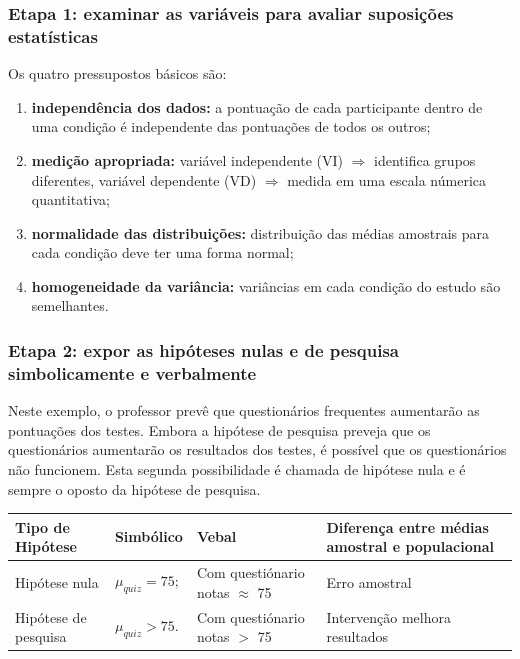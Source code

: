 \documentclass[11pt]{beamer}
\begin{document}
\begin{frame}
\frametitle{Etapa 1: examinar as variáveis para avaliar suposições estatísticas}

Os quatro pressupostos básicos são:

\begin{enumerate}
\item \textbf{independência dos dados:} a pontuação de cada participante dentro de uma condição é independente das pontuações de todos os outros;
\item \textbf{medição apropriada:} variável independente (VI) \(\Rightarrow\) identifica grupos diferentes, variável dependente (VD) \(\Rightarrow\) medida em uma escala númerica quantitativa;
\item \textbf{normalidade das distribuições:} distribuição das médias amostrais para cada condição deve ter uma forma normal;
\item \textbf{homogeneidade da variância:} variâncias em cada condição do estudo são semelhantes.
\end{enumerate}

\end{frame}

\begin{frame}
\frametitle{Etapa 2: expor as hipóteses nulas e de pesquisa simbolicamente e verbalmente}

Neste exemplo, o professor prevê que questionários frequentes aumentarão as pontuações dos testes. Embora a hipótese de pesquisa preveja que os questionários aumentarão os resultados dos testes, é possível que os questionários não funcionem. Esta segunda possibilidade é chamada de hipótese nula e é sempre o oposto da hipótese de pesquisa.

\begin{center}
\begin{tabular}{ m{2cm}|m{2cm}|m{3cm}|m{3cm} } 
 \hline
 Tipo de Hipótese & Simbólico & Vebal & Diferença entre médias amostral e populacional\\
  \hline
 Hipótese nula & $\mu_{quiz}=75;$ & Com questiónario notas $\approx$ 75 & Erro amostral \\ 
 Hipótese de pesquisa & $\mu_{quiz}>75.$ & Com questiónario notas $>$ 75 & Intervenção melhora resultados  \\ 
 \hline
 \hline
\end{tabular}
\end{center}

\end{frame}
\end{document}
